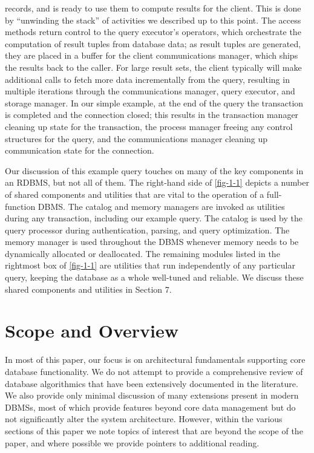 \documentclass[a4paper,11pt,twoside,openright]{book}
\begin{document}
\begin{enumerate}
  records, and is ready to use them to compute results for the client.
  This is done by ``unwinding the stack'' of activities we described up
  to this point. The access methods return control to the query
  executor's operators, which orchestrate the computation of result
  tuples from database data; as result tuples are generated, they are
  placed in a buffer for the client communications manager, which ships
  the results back to the caller. For large result sets, the client
  typically will make additional calls to fetch more data incrementally
  from the query, resulting in multiple iterations through the
  communications manager, query executor, and storage manager. In our
  simple example, at the end of the query the transaction is completed
  and the connection closed; this results in the transaction manager
  cleaning up state for the transaction, the process manager freeing any
  control structures for the query, and the communications manager
  cleaning up communication state for the connection.
\end{enumerate}

Our discussion of this example query touches on many of the key
components in an RDBMS, but not all of them. The right-hand side of
\autoref{fig-1-1} depicts a number of shared components and utilities that are
vital to the operation of a full-function DBMS. The catalog and memory
managers are invoked as utilities during any transaction, including our
example query. The catalog is used by the query processor during
authentication, parsing, and query optimization. The memory manager is
used throughout the DBMS whenever memory needs to be dynamically
allocated or deallocated. The remaining modules listed in the rightmost
box of \autoref{fig-1-1} are utilities that run independently of any particular
query, keeping the database as a whole well-tuned and reliable. We
discuss these shared components and utilities in Section 7.

\hypertarget{scope-and-overview}{%
\section{Scope and Overview}\label{scope-and-overview}}

In most of this paper, our focus is on architectural fundamentals
supporting core database functionality. We do not attempt to provide a
comprehensive review of database algorithmics that have been extensively
documented in the literature. We also provide only minimal discussion of
many extensions present in modern DBMSs, most of which provide features
beyond core data management but do not significantly alter the system
architecture. However, within the various sections of this paper we note
topics of interest that are beyond the scope of the paper, and where
possible we provide pointers to additional reading.
\end{document}
